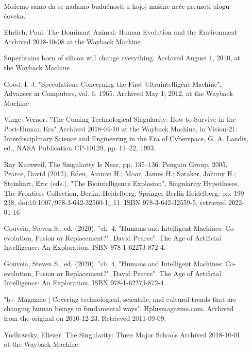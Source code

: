 \documentclass[a4paper]{article}
\begin{document}
Možemo samo da se nadamo budućnosti u kojoj mašine neće preuzeti ulogu čoveka.

\appendix

\begin{thebibliography}{9}

 Ehrlich, Paul. The Dominant Animal: Human Evolution and the Environment Archived 2018-10-08 at the Wayback Machine

 Superbrains born of silicon will change everything. Archived August 1, 2010, at the Wayback Machine

  Good, I. J. "Speculations Concerning the First Ultraintelligent Machine", Advances in Computers, vol. 6, 1965. Archived May 1, 2012, at the Wayback Machine
 
   Vinge, Vernor. "The Coming Technological Singularity: How to Survive in the Post-Human Era" Archived 2018-04-10 at the Wayback Machine, in Vision-21: Interdisciplinary Science and Engineering in the Era of Cyberspace, G. A. Landis, ed., NASA Publication CP-10129, pp. 11–22, 1993.
  
   Ray Kurzweil, The Singularity Is Near, pp. 135–136. Penguin Group, 2005.
 Pearce, David (2012), Eden, Amnon H.; Moor, James H.; Søraker, Johnny H.; Steinhart, Eric (eds.), "The Biointelligence Explosion", Singularity Hypotheses, The Frontiers Collection, Berlin, Heidelberg: Springer Berlin Heidelberg, pp. 199–238, doi:10.1007/978-3-642-32560-1\_11, ISBN 978-3-642-32559-5, retrieved 2022-01-16


 Gouveia, Steven S., ed. (2020). "ch. 4, "Humans and Intelligent Machines: Co-evolution, Fusion or Replacement?", David Pearce". The Age of Artificial Intelligence: An Exploration. ISBN 978-1-62273-872-4.

 Gouveia, Steven S., ed. (2020). "ch. 4, "Humans and Intelligent Machines: Co-evolution, Fusion or Replacement?", David Pearce". The Age of Artificial Intelligence: An Exploration. ISBN 978-1-62273-872-4.

 "h+ Magazine | Covering technological, scientific, and cultural trends that are changing human beings in fundamental ways". Hplusmagazine.com. Archived from the original on 2010-12-23. Retrieved 2011-09-09.

  Yudkowsky, Eliezer. The Singularity: Three Major Schools Archived 2018-10-01 at the Wayback Machine.


\end{thebibliography}
\end{document}
